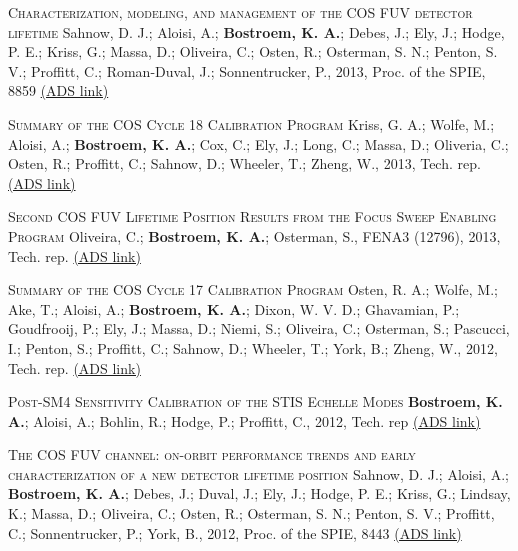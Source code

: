 \begin{revnumerate}[24]
\item{\textsc{Characterization, modeling, and management of the COS FUV detector lifetime}
Sahnow, D. J.; Aloisi, A.; \textbf{Bostroem, K. A.}; Debes, J.; Ely, J.; Hodge, P. E.; Kriss, G.; Massa, D.; Oliveira, C.; Osten, R.; Osterman, S. N.; Penton, S. V.; Proffitt, C.; Roman-Duval, J.; Sonnentrucker, P., 2013, Proc. of the SPIE, 8859 
\color{blue}\href{https://ui.adsabs.harvard.edu/#abs/2013SPIE.8859E..0SS/abstract}{(ADS link)}\color{black}}\\

\item{\textsc{Summary of the COS Cycle 18 Calibration Program}
Kriss, G. A.; Wolfe, M.; Aloisi, A.; \textbf{Bostroem, K. A.}; Cox, C.; Ely, J.; Long, C.; Massa, D.; Oliveria, C.; Osten, R.; Proffitt, C.; Sahnow, D.; Wheeler, T.; Zheng, W., 2013, Tech. rep. 
\color{blue}\href{https://ui.adsabs.harvard.edu/#abs/2013cos..rept....4K/abstract}{(ADS link)}\color{black}}\\ %

\item{\textsc{Second COS FUV Lifetime Position Results from the Focus Sweep Enabling Program}
Oliveira, C.; \textbf{Bostroem, K. A.}; Osterman, S., FENA3 (12796), 2013, Tech. rep. 
\color{blue}\href{https://ui.adsabs.harvard.edu/#abs/2013cos..rept....1O/abstract}{(ADS link)}\color{black}}\\ %

\item{\textsc{Summary of the COS Cycle 17 Calibration Program} 
Osten, R. A.; Wolfe, M.; Ake, T.; Aloisi, A.; \textbf{Bostroem, K. A.}; Dixon, W. V. D.; Ghavamian, P.; Goudfrooij, P.; Ely, J.; Massa, D.; Niemi, S.; Oliveira, C.; Osterman, S.; Pascucci, I.; Penton, S.; Proffitt, C.; Sahnow, D.; Wheeler, T.; York, B.; Zheng, W., 2012, Tech. rep. 
\color{blue}\href{https://ui.adsabs.harvard.edu/#abs/2012cos..rept....2O/abstract}{(ADS link)}\color{black}}\\ %

\item{\textsc{Post-SM4 Sensitivity Calibration of the STIS Echelle Modes} 
{\bf Bostroem, K. A.}; Aloisi, A.; Bohlin, R.; Hodge, P.; Proffitt, C., 2012, Tech. rep 
\color{blue}\href{https://ui.adsabs.harvard.edu/#abs/2012stis.rept....1B/abstract}{(ADS link)}\color{black}}\\%

\item{\textsc{The COS FUV channel: on-orbit performance trends and early characterization of a new detector lifetime position}
Sahnow, D. J.; Aloisi, A.; \textbf{Bostroem, K. A.}; Debes, J.; Duval, J.; Ely, J.; Hodge, P. E.; Kriss, G.; Lindsay, K.; Massa, D.; Oliveira, C.; Osten, R.; Osterman, S. N.; Penton, S. V.; Proffitt, C.; Sonnentrucker, P.; York, B., 2012, Proc. of the SPIE, 8443 
\color{blue}\href{https://ui.adsabs.harvard.edu/#abs/2012SPIE.8443E..4CS/abstract}{(ADS link)}\color{black}}\\


\end{revnumerate}
